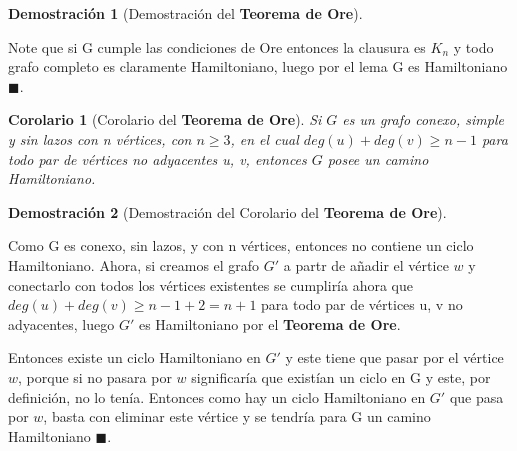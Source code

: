 \documentclass[a4paper,1pt]{report}
\newtheorem*{cor}{Corolario}
\newtheorem*{dem}{Demostración}
\begin{document}
\begin{dem}[Demostración del \textbf{Teorema de Ore}]
 
\end{dem}

Note que si G cumple las condiciones de Ore entonces la clausura es $K_n$ y todo grafo completo es claramente Hamiltoniano, luego por el lema G es Hamiltoniano  $\blacksquare$.
  
\begin{cor}[Corolario del \textbf{Teorema de Ore}]
  Si $G$ es un grafo conexo, simple y sin lazos con n vértices, con $n\geq 3$, en el cual $deg(u)+deg(v)\geq n - 1$ para todo par de vértices no adyacentes u, v, entonces $G$ posee un camino Hamiltoniano.
\end{cor}

\begin{dem}[Demostración del Corolario del \textbf{Teorema de Ore}]
 
\end{dem}

Como G es conexo, sin lazos, y con n vértices, entonces no contiene un ciclo Hamiltoniano. Ahora, si creamos el grafo $G'$ a partr de añadir el vértice $w$ y conectarlo con todos los vértices existentes se cumpliría ahora  que\\ $deg(u)+deg(v)\geq n - 1 + 2 = n + 1$ para todo par de vértices u, v no adyacentes,
luego $G'$ es Hamiltoniano por el \textbf{Teorema de Ore}.

Entonces existe un ciclo Hamiltoniano en $G'$ y este tiene que pasar por el vértice $w$, porque si no pasara por $w$ significaría que existían un ciclo en G y este, por definición, no lo tenía. Entonces como hay un ciclo Hamiltoniano en $G'$ que pasa por $w$, basta con eliminar este vértice y se tendría para G un camino Hamiltoniano $\blacksquare$.
\end{document}
